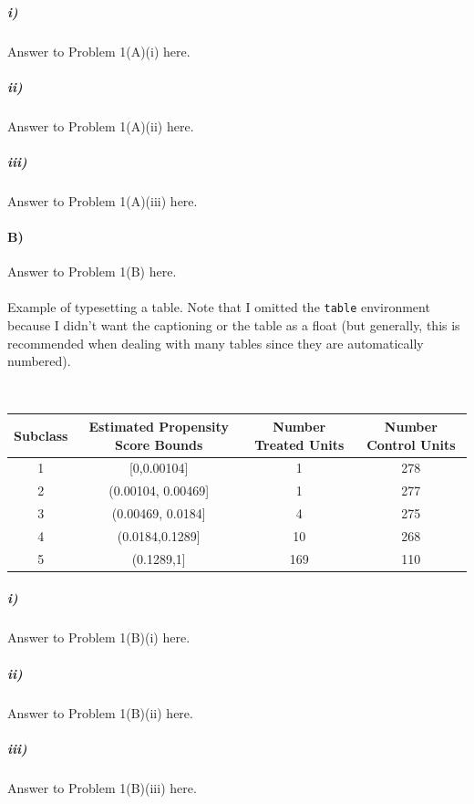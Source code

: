 \documentclass[10pt,letter]{article}
\begin{document}
\subparagraph{i)} Answer to Problem 1(A)(i) here.


\subparagraph{ii)} Answer to Problem 1(A)(ii) here.

\subparagraph{iii)} Answer to Problem 1(A)(iii) here.

\paragraph{B)} Answer to Problem 1(B) here.
\\
\\
Example of typesetting a table. Note that I omitted the \verb/table/
environment because I didn't want the captioning or the table as a
float (but generally, this is recommended when dealing with many
tables since they are automatically numbered).\\
{\color{Orchid}
\\
\begin{tabular}{|c|c|c|c|}
\hline
 \textbf{Subclass} & \textbf{Estimated Propensity Score Bounds} & \textbf{Number Treated Units} &
 \textbf{Number Control Units} \\
\hline
 1 & [0,0.00104] & 1 & 278 \\
\hline
2&  (0.00104, 0.00469]  & 1 & 277  \\
\hline
3&  (0.00469, 0.0184]  & 4 & 275  \\
\hline
4&  (0.0184,0.1289]  & 10 & 268  \\
\hline
5&  (0.1289,1]  & 169 & 110  \\
\hline
\end{tabular}
}

\subparagraph{i)} Answer to Problem 1(B)(i) here.

\subparagraph{ii)} Answer to Problem 1(B)(ii) here.

\subparagraph{iii)} Answer to Problem 1(B)(iii) here.
\end{document}
